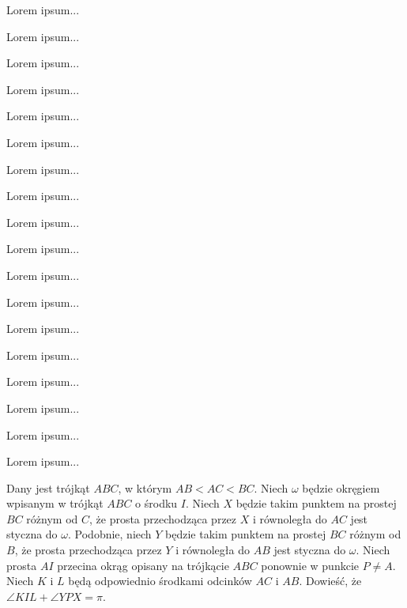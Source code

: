 \begin{exercise}[1/2021] Lorem ipsum... \end{exercise}
\begin{exercise}[2/2021] Lorem ipsum... \end{exercise}
\begin{exercise}[3/2021] Lorem ipsum... \end{exercise}
\begin{exercise}[4/2021] Lorem ipsum... \end{exercise}
\begin{exercise}[5/2021] Lorem ipsum... \end{exercise}
\begin{exercise}[6/2021] Lorem ipsum... \end{exercise}

\begin{exercise}[1/2022] Lorem ipsum... \end{exercise}
\begin{exercise}[2/2022] Lorem ipsum... \end{exercise}
\begin{exercise}[3/2022] Lorem ipsum... \end{exercise}
\begin{exercise}[4/2022] Lorem ipsum... \end{exercise}
\begin{exercise}[5/2022] Lorem ipsum... \end{exercise}
\begin{exercise}[6/2022] Lorem ipsum... \end{exercise}

\begin{exercise}[1/2023] Lorem ipsum... \end{exercise}
\begin{exercise}[2/2023] Lorem ipsum... \end{exercise}
\begin{exercise}[3/2023] Lorem ipsum... \end{exercise}
\begin{exercise}[4/2023] Lorem ipsum... \end{exercise}
\begin{exercise}[5/2023] Lorem ipsum... \end{exercise}
\begin{exercise}[6/2023] Lorem ipsum... \end{exercise}

\begin{exercise}[4/2024]
    Dany jest trójkąt $ABC$, w którym $AB < AC < BC$.
    Niech $\omega$ będzie okręgiem wpisanym w trójkąt $ABC$ o środku $I$.
    Niech $X$ będzie takim punktem na prostej $BC$ różnym od $C$, że prosta przechodząca przez $X$ i równoległa do $AC$ jest styczna do $\omega$.
    Podobnie, niech $Y$ będzie takim punktem na prostej $BC$ różnym od $B$, że prosta przechodząca przez $Y$ i równoległa do $AB$ jest styczna do $\omega$.
    Niech prosta $AI$ przecina okrąg opisany na trójkącie $ABC$ ponownie w punkcie $P \neq A$.
    Niech $K$ i $L$ będą odpowiednio środkami odcinków $AC$ i $AB$.
    Dowieść, że $\angle KIL + \angle YPX = \pi$.
\end{exercise}
